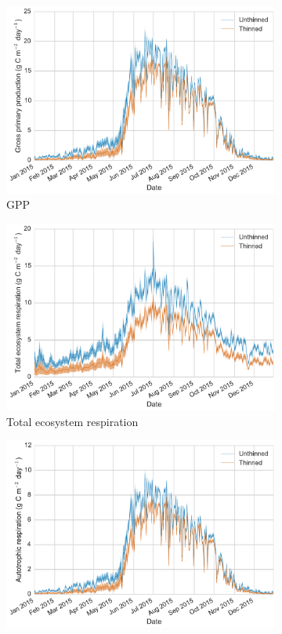 \documentclass[12pt]{article}
\begin{document}
\begin{figure}[ht]
    \centering
    \begin{subfigure}[b]{0.48\textwidth}
        \includegraphics[width=\textwidth]{gpp.pdf}
        \caption{GPP}
        \label{fig:gpp}
        \end{subfigure}
     \begin{subfigure}[b]{0.48\textwidth}
        \includegraphics[width=\textwidth]{rt.pdf}
        \caption{Total ecosystem respiration}
        \label{fig:rt}
    \end{subfigure}
    \begin{subfigure}[b]{0.48\textwidth}
        \includegraphics[width=\textwidth]{ra.pdf}

\end{subfigure}
\end{figure}
\end{document}
